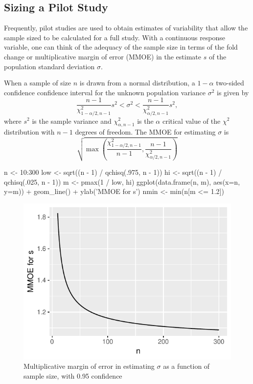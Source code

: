 \subsection{Sizing a Pilot Study}
Frequently, pilot studies are used to obtain estimates of variability
that allow the sample sized to be calculated for a full study.  With a
continuous response variable, one can think of the adequacy of the
sample size in terms of the fold change or multiplicative margin of
error (MMOE) in the estimate $s$ of the population standard deviation $\sigma$.

When a sample of size $n$ is
drawn from a normal distribution, a $1 - \alpha$ two-sided confidence confidence
interval for the unknown population variance $\sigma^2$ is
given by
\begin{equation}
  \frac{n-1}{\chi^{2}_{1-\alpha/2,n-1}} s^{2} < \sigma^{2} <
  \frac{n-1}{\chi^{2}_{\alpha/2,n-1}} s^{2},
  \end{equation}
where $s^2$ is the sample variance and $\chi^{2}_{\alpha,n-1}$ is the
$\alpha$ critical value of the $\chi^2$ distribution with $n-1$
degrees of freedom.  The MMOE for estimating $\sigma$ is
\begin{equation}
  \sqrt{\max(\frac{\chi^{2}_{1-\alpha/2,n-1}}{n-1},
  \frac{n-1}{\chi^{2}_{\alpha/2,n-1}})}
\end{equation}
\begin{Schunk}
\begin{Sinput}
n    <- 10:300
low  <- sqrt((n - 1) / qchisq(.975, n - 1))
hi   <- sqrt((n - 1) / qchisq(.025, n - 1))
m    <- pmax(1 / low, hi)
ggplot(data.frame(n, m), aes(x=n, y=m)) + geom_line() +
  ylab('MMOE for s')
nmin <- min(n[m <= 1.2])
\end{Sinput}
\begin{figure}[htbp]

\centerline{\includegraphics[width=\maxwidth]{htest-smmoe-1} }

\caption[Margin of error in estimating $\sigma$]{Multiplicative margin of error in estimating $\sigma$ as a function of sample size, with 0.95 confidence}\label{fig:htest-smmoe}
\end{figure}
\end{Schunk}
